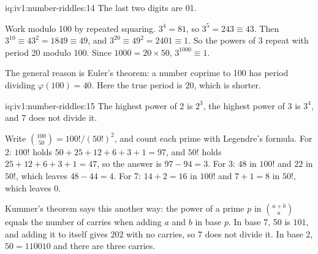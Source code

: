\begin{solution}{iq:iv1:number-riddles:14}
The last two digits are 01.

Work modulo 100 by repeated squaring. $3^4 = 81$, so $3^5 = 243 \equiv 43$. Then $3^{10} \equiv 43^2 = 1849 \equiv 49$, and $3^{20} \equiv 49^2 = 2401 \equiv 1$. So the powers of 3 repeat with period 20 modulo 100. Since $1000 = 20 \times 50$, $3^{1000} \equiv 1$.

The general reason is Euler's theorem: a number coprime to 100 has period dividing $\varphi(100) = 40$. Here the true period is 20, which is shorter.

\end{solution}

\begin{solution}{iq:iv1:number-riddles:15}
The highest power of 2 is $2^3$, the highest power of 3 is $3^4$, and 7 does not divide it.

Write $\binom{100}{50} = 100! / (50!)^2$, and count each prime with Legendre's formula. For 2: $100!$ holds $50 + 25 + 12 + 6 + 3 + 1 = 97$, and $50!$ holds $25 + 12 + 6 + 3 + 1 = 47$, so the answer is $97 - 94 = 3$. For 3: $48$ in $100!$ and $22$ in $50!$, which leaves $48 - 44 = 4$. For 7: $14 + 2 = 16$ in $100!$ and $7 + 1 = 8$ in $50!$, which leaves 0.

Kummer's theorem says this another way: the power of a prime $p$ in $\binom{a + b}{a}$ equals the number of carries when adding $a$ and $b$ in base $p$. In base 7, 50 is $101$, and adding it to itself gives $202$ with no carries, so 7 does not divide it. In base 2, $50 = 110010$ and there are three carries.

\end{solution}

